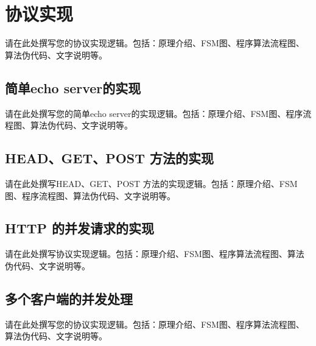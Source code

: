 \chapter{协议实现}
请在此处撰写您的协议实现逻辑。包括：原理介绍、FSM图、程序算法流程图、算法伪代码、文字说明等。

\section{简单echo server的实现}
请在此处撰写您的简单echo server的实现逻辑。包括：原理介绍、FSM图、程序流程图、算法伪代码、文字说明等。

\section{HEAD、GET、POST 方法的实现}
请在此处撰写HEAD、GET、POST 方法的实现逻辑。包括：原理介绍、FSM图、程序流程图、算法伪代码、文字说明等。

\section{HTTP 的并发请求的实现}
请在此处撰写协议实现逻辑。包括：原理介绍、FSM图、程序算法流程图、算法伪代码、文字说明等。

\section{多个客户端的并发处理}
请在此处撰写您的协议实现逻辑。包括：原理介绍、FSM图、程序算法流程图、算法伪代码、文字说明等。